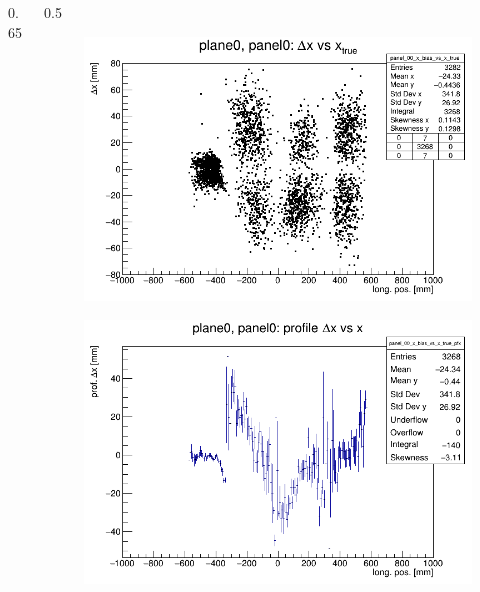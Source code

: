 \documentclass{beamer}
\begin{document}
\begin{frame}
\begin{columns}
\begin{column}{0.65\framewidth}
\begin{itemize}
\end{itemize}
\end{column}
\begin{column}{0.5\framewidth}
\vspace{-3mm}
      \begin{figure}[!h]
      \centering
\includegraphics[width=1.\columnwidth]{figures/png/panel_00_x_bias_vs_x.png}
     \label{fig:normalhits}
\end{figure}
\vspace{-5mm}
         \begin{figure}[!h]
      \centering
      \includegraphics[width=1.\columnwidth]{figures/png/panel_00_x_bias_vs_x_prof.png}
     \label{fig:normalhits}
\end{figure}
\end{column}
\end{columns}
\end{frame}
\end{document}
